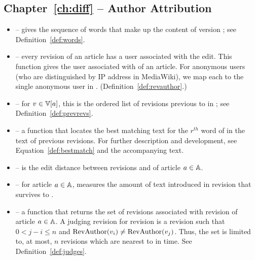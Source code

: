 \subsection{Chapter~\ref{ch:diff} -- Author Attribution}

\begin{itemize}

\item \words{\version{}} -- gives the sequence of words that make
    up the content of version \version{}; see
    Definition~\ref{def:words}.

\item \revauthor{\version{}} -- every revision of an article has
    a user associated with the edit.
    This function gives the user associated with \version{} of
    an article.
    For anonymous users (who are distinguished by IP address in
    MediaWiki), we map each to the single anonymous user in \users.
    (Definition~\ref{def:revauthor}.)

\item \prevrevs{\version{}} -- for $\version{} \in \versions{a}$,
    this is the ordered list of revisions previous to \version{}
    in ; see Definition~\ref{def:prevrevs}.

\item {} -- a function
    that locates the best matching text for the $r^{th}$ word of
     in the text of previous revisions.
    For further description and development, see
    Equation~\ref{def:bestmatch} and the accompanying text.

\item {} -- is the edit distance between revisions
     and  of article $a \in \mathbb{A}$.

\item {} -- for article $a \in \mathbb{A}$, measures the
    amount of text introduced in revision 
    that survives to .

\item {} -- a function that returns the set of
     revisions associated with revision 
    of article $a \in \mathbb{A}$.
    A judging revision for revision  is a revision 
    such that $0 < j - i \le n$ and
    $\mathrm{RevAuthor}(v_{i}) \not= \mathrm{RevAuthor}(v_{j})$.
    Thus, the set is limited to, at most, $n$ revisions which are nearest
    to  in time.  See Definition~\ref{def:judges}.

\end{itemize}


\renewcommand{\labelitemi}{$\bullet$}



